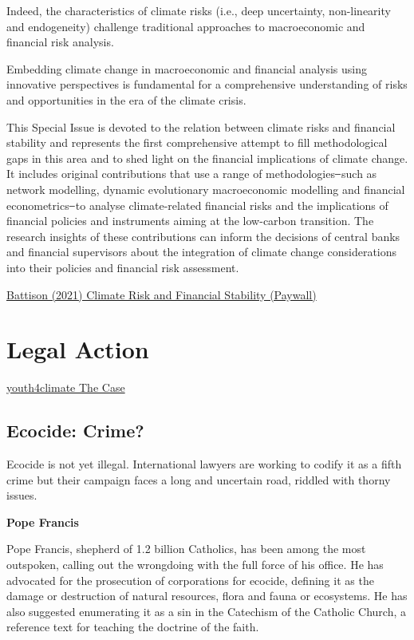 \documentclass[
]{book}
\begin{document}
Indeed, the characteristics of climate risks (i.e., deep uncertainty, non-linearity and endogeneity) challenge traditional approaches to macroeconomic and financial risk analysis.

Embedding climate change in macroeconomic and financial analysis using innovative perspectives is fundamental for a comprehensive understanding of risks and opportunities in the era of the climate crisis.

This Special Issue is devoted to the relation between climate risks and financial stability and represents the first comprehensive attempt to fill methodological gaps in this area and to shed light on the financial implications of climate change. It includes original contributions that use a range of methodologies ̶ such as network modelling, dynamic evolutionary macroeconomic modelling and financial econometrics ̶ to analyse climate-related financial risks and the implications of financial policies and instruments aiming at the low-carbon transition. The research insights of these contributions can inform the decisions of central banks and financial supervisors about the integration of climate change considerations into their policies and financial risk assessment.

\href{https://www.sciencedirect.com/science/article/abs/pii/S1572308921000267}{Battison (2021) Climate Risk and Financial Stability (Paywall)}

\hypertarget{legal-action}{%
\chapter{Legal Action}\label{legal-action}}

\href{https://youth4climatejustice.org/the-case/}{youth4climate The Case}

\hypertarget{ecocide-crime}{%
\section{Ecocide: Crime?}\label{ecocide-crime}}

Ecocide is not yet illegal. International lawyers are working to
codify it as a fifth crime but their campaign faces a long and uncertain road,
riddled with thorny issues.

\textbf{Pope Francis}

Pope Francis, shepherd of 1.2 billion Catholics, has been among the most outspoken,
calling out the wrongdoing with the full force of his office.
He has advocated for the prosecution of corporations for ecocide,
defining it as the damage or destruction of natural resources, flora and fauna or ecosystems.
He has also suggested enumerating it as a sin in the Catechism of the Catholic Church,
a reference text for teaching the doctrine of the faith.
\end{document}
